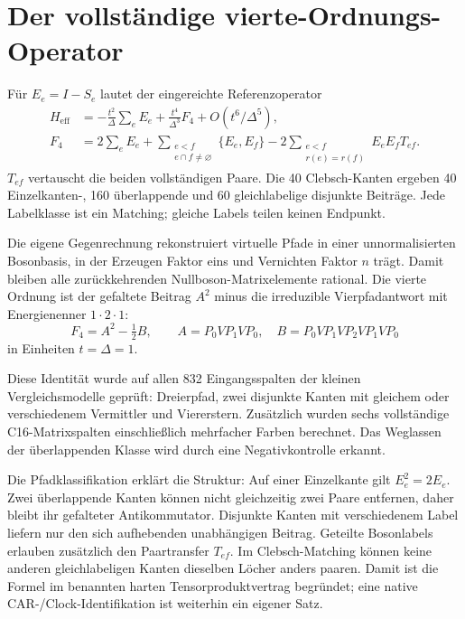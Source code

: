 \section{Der vollständige vierte-Ordnungs-Operator}
Für $E_e=I-S_e$ lautet der eingereichte Referenzoperator
\begin{align}
H_{\mathrm{eff}}&=-\frac{t^2}{\Delta}\sum_eE_e
+\frac{t^4}{\Delta^3}F_4+O(t^6/\Delta^5),\\
F_4&=2\sum_eE_e+
\sum_{\substack{e<f\\e\cap f\ne\varnothing}}\{E_e,E_f\}
-2\sum_{\substack{e<f\\r(e)=r(f)}}E_eE_fT_{ef}.
\end{align}
$T_{ef}$ vertauscht die beiden vollständigen Paare. Die 40 Clebsch-Kanten ergeben 40 Einzelkanten-, 160 überlappende und 60 gleichlabelige disjunkte Beiträge. Jede Labelklasse ist ein Matching; gleiche Labels teilen keinen Endpunkt.

Die eigene Gegenrechnung rekonstruiert virtuelle Pfade in einer unnormalisierten Bosonbasis, in der Erzeugen Faktor eins und Vernichten Faktor $n$ trägt. Damit bleiben alle zurückkehrenden Nullboson-Matrixelemente rational. Die vierte Ordnung ist der gefaltete Beitrag $A^2$ minus die irreduzible Vierpfadantwort mit Energienenner $1\cdot2\cdot1$:
\begin{equation}
F_4=A^2-\tfrac12 B,\qquad
A=P_0VP_1VP_0,\quad B=P_0VP_1VP_2VP_1VP_0
\end{equation}
in Einheiten $t=\Delta=1$.

Diese Identität wurde auf allen 832 Eingangsspalten der kleinen Vergleichsmodelle geprüft: Dreierpfad, zwei disjunkte Kanten mit gleichem oder verschiedenem Vermittler und Viererstern. Zusätzlich wurden sechs vollständige C16-Matrixspalten einschließlich mehrfacher Farben berechnet. Das Weglassen der überlappenden Klasse wird durch eine Negativkontrolle erkannt.

Die Pfadklassifikation erklärt die Struktur: Auf einer Einzelkante gilt $E_e^2=2E_e$. Zwei überlappende Kanten können nicht gleichzeitig zwei Paare entfernen, daher bleibt ihr gefalteter Antikommutator. Disjunkte Kanten mit verschiedenem Label liefern nur den sich aufhebenden unabhängigen Beitrag. Geteilte Bosonlabels erlauben zusätzlich den Paartransfer $T_{ef}$. Im Clebsch-Matching können keine anderen gleichlabeligen Kanten dieselben Löcher anders paaren. Damit ist die Formel im benannten harten Tensorproduktvertrag begründet; eine native CAR-/Clock-Identifikation ist weiterhin ein eigener Satz.

